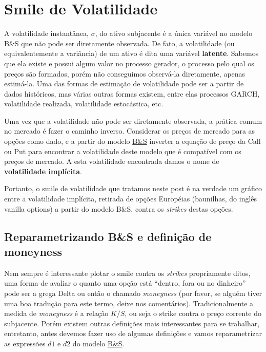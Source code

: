 \documentclass[]{book}
\theoremstyle{definition}
\theoremstyle{definition}
\theoremstyle{definition}
\theoremstyle{remark}
\begin{document}
\hypertarget{smile}{%
\chapter{Smile de Volatilidade}\label{smile}}

A volatilidade instantânea, \(\sigma\), do ativo subjacente é a única variável no modelo B\&S que não pode ser diretamente observada. De fato, a volatilidade (ou equivalentemente a variância) de um ativo é dita uma variável \textbf{latente}. Sabemos que ela existe e possui algum valor no processo gerador, o processo pelo qual os preços são formados, porém não conseguimos observá-la diretamente, apenas estimá-la. Uma das formas de estimação de volatilidade pode ser a partir de dados históricos, mas várias outras formas existem, entre elas processos GARCH, volatilidade realizada, volatilidade estocástica, etc.

Uma vez que a volatilidade não pode ser diretamente observada, a prática comum no mercado é fazer o caminho inverso. Considerar os preços de mercado para as opções como dado, e a partir do modelo \protect\hyperlink{bsm}{B\&S} inverter a equação de preço da Call ou Put para encontrar a volatilidade deste modelo que é compatível com os preços de mercado. A esta volatilidade encontrada damos o nome de \textbf{volatilidade implícita}.

Portanto, o smile de volatilidade que tratamos neste post é na verdade um gráfico entre a volatilidade implícita, retirada de opções Européias (baunilhas, do inglês vanilla options) a partir do modelo B\&S, contra os \emph{strikes} destas opções.

\hypertarget{reparametrizando}{%
\section{Reparametrizando B\&S e definição de moneyness}\label{reparametrizando}}

Nem sempre é interessante plotar o smile contra os \emph{strikes} propriamente ditos, uma forma de avaliar o quanto uma opção está ``dentro, fora ou no dinheiro'' pode ser a grega Delta ou então o chamado \emph{moneyness} (por favor, se alguém tiver uma boa tradução para este termo, deixe nos comentários). Tradicionalmente a medida de \emph{moneyness} é a relação \(K/S\), ou seja o strike contra o preço corrente do subjacente. Porém existem outras definições mais interessantes para se trabalhar, entretanto, antes devemos fazer uso de algumas definições e vamos reparametrizar as expressões \(d1\) e \(d2\) do modelo \protect\hyperlink{bsm}{B\&S}.
\end{document}
